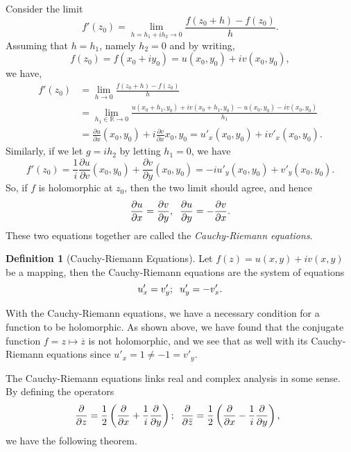 \documentclass[
]{article}
\theoremstyle{definition}
\theoremstyle{definition}
\newtheorem{definition}{Definition}[section]
\begin{document}
Consider the limit
\[f'(z_0) = \lim_{h = h_1 + ih_2 \to 0} \frac{f(z_0 + h) - f(z_0)}{h}.\]
Assuming that \(h = h_1\), namely \(h_2 = 0\) and by writing,
\[f(z_0) = f(x_0 + iy_0) = u(x_0, y_0) + iv(x_0, y_0),\] we have,
\[ \begin{split}
  f'(z_0) & = \lim_{h \to 0} \frac{f(z_0 + h) - f(z_0)}{h} \\
    & = \lim_{h_1 \in \mathbb{R} \to 0} \frac{u(x_0 + h_1, y_0) + 
      iv(x_0 + h_1, y_0) - u(x_0, y_0) - iv(x_0, y_0)}{h_1} \\
    & = \frac{\partial u}{\partial x}(x_0, y_0) + i \frac{\partial v}{\partial x}{x_0, y_0} 
      = u'_x(x_0, y_0) + i v'_x(x_0, y_0).
\end{split} \] Similarly, if we let \(g = ih_2\) by letting \(h_1 = 0\),
we have
\[f'(z_0) = \frac{1}{i}\frac{\partial u}{\partial v}(x_0, y_0) + 
  \frac{\partial v}{\partial y}(x_0, y_0) = -iu'_y(x_0, y_0) + v'_y(x_0, y_0).\]
So, if \(f\) is holomorphic at \(z_0\), then the two limit should agree,
and hence
\[\frac{\partial u}{\partial x} = \frac{\partial v}{\partial y}, \hspace{2mm} 
  \frac{\partial u}{\partial y} = - \frac{\partial v}{\partial x}.\]
These two equations together are called the \emph{Cauchy-Riemann
equations}.

\begin{definition}[Cauchy-Riemann Equations]
  Let \(f(z) = u(x, y) + iv(x, y)\) be a mapping, then the Cauchy-Riemann equations 
  are the system of equations 
  \[u'_x = v'_y; \hspace{2mm} u'_y = - v'_x.\] 
\end{definition}

With the Cauchy-Riemann equations, we have a necessary condition for a
function to be holomorphic. As shown above, we have found that the
conjugate function \(f = z \mapsto \overline{z}\) is not holomorphic,
and we see that as well with its Cauchy-Riemann equations since
\(u'_x = 1 \neq -1 = v'_y\).

The Cauchy-Riemann equations links real and complex analysis in some
sense. By defining the operators
\[ \frac{\partial}{\partial z} = \frac{1}{2}\left(\frac{\partial}{\partial x} + 
  \frac{1}{i} \frac{\partial}{\partial y}\right); \hspace{2mm} 
\frac{\partial}{\partial \bar{z}} = \frac{1}{2}\left(\frac{\partial}{\partial x} - 
  \frac{1}{i} \frac{\partial}{\partial y}\right), \hspace{2mm} \] we
have the following theorem.
\end{document}
